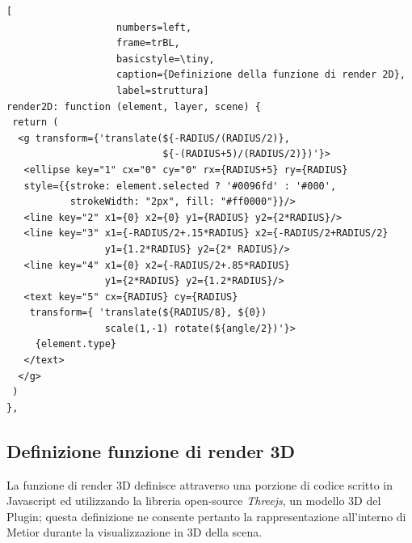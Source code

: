 \begin{lstlisting}[
                   numbers=left,
                   frame=trBL,
                   basicstyle=\tiny,
                   caption={Definizione della funzione di render 2D},
                   label=struttura]
render2D: function (element, layer, scene) {
 return (
  <g transform={'translate(${-RADIUS/(RADIUS/2)},
                           ${-(RADIUS+5)/(RADIUS/2)})'}>
   <ellipse key="1" cx="0" cy="0" rx={RADIUS+5} ry={RADIUS}
   style={{stroke: element.selected ? '#0096fd' : '#000',
           strokeWidth: "2px", fill: "#ff0000"}}/>
   <line key="2" x1={0} x2={0} y1={RADIUS} y2={2*RADIUS}/>
   <line key="3" x1={-RADIUS/2+.15*RADIUS} x2={-RADIUS/2+RADIUS/2}
                 y1={1.2*RADIUS} y2={2* RADIUS}/>
   <line key="4" x1={0} x2={-RADIUS/2+.85*RADIUS}
                 y1={2*RADIUS} y2={1.2*RADIUS}/>
   <text key="5" cx={RADIUS} cy={RADIUS}
    transform={ 'translate(${RADIUS/8}, ${0})
                 scale(1,-1) rotate(${angle/2})'}>
     {element.type}
   </text>
  </g>
 )
},
\end{lstlisting}
\newpage

\subsection{Definizione funzione di render 3D}
La funzione di render 3D definisce attraverso una porzione di codice scritto in Javascript ed utilizzando
la libreria open-source \emph{Threejs}, un modello 3D del Plugin;
questa definizione ne consente pertanto la rappresentazione all'interno di Metior durante la visualizzazione in 3D della scena.\\


